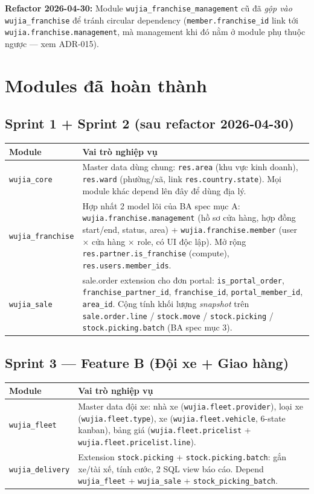 \textbf{Refactor 2026-04-30:} Module \texttt{wujia\_franchise\_management} cũ đã \emph{gộp vào} \texttt{wujia\_franchise} để tránh circular dependency (\texttt{member.franchise\_id} link tới \texttt{wujia.franchise.management}, mà management khi đó nằm ở module phụ thuộc ngược --- xem ADR-015).

\section{Modules đã hoàn thành}

\subsection{Sprint 1 + Sprint 2 (sau refactor 2026-04-30)}

\begin{longtable}{p{4cm} p{10cm}}
\toprule
\textbf{Module} & \textbf{Vai trò nghiệp vụ} \\
\midrule
\endhead
\texttt{wujia\_core} & Master data dùng chung: \texttt{res.area} (khu vực kinh doanh), \texttt{res.ward} (phường/xã, link \texttt{res.country.state}). Mọi module khác depend lên đây để dùng địa lý. \\
\texttt{wujia\_franchise} & Hợp nhất 2 model lõi của BA spec mục A: \texttt{wujia.franchise.management} (hồ sơ cửa hàng, hợp đồng start/end, status, area) + \texttt{wujia.franchise.member} (user × cửa hàng × role, có UI độc lập). Mở rộng \texttt{res.partner.is\_franchise} (compute), \texttt{res.users.member\_ids}. \\
\texttt{wujia\_sale} & sale.order extension cho đơn portal: \texttt{is\_portal\_order}, \texttt{franchise\_partner\_id}, \texttt{franchise\_id}, \texttt{portal\_member\_id}, \texttt{area\_id}. Cộng tính khối lượng \emph{snapshot} trên \texttt{sale.order.line} / \texttt{stock.move} / \texttt{stock.picking} / \texttt{stock.picking.batch} (BA spec mục 3). \\
\bottomrule
\end{longtable}

\subsection{Sprint 3 --- Feature B (Đội xe + Giao hàng)}

\begin{longtable}{p{4cm} p{10cm}}
\toprule
\textbf{Module} & \textbf{Vai trò nghiệp vụ} \\
\midrule
\endhead
\texttt{wujia\_fleet} & Master data đội xe: nhà xe (\texttt{wujia.fleet.provider}), loại xe (\texttt{wujia.fleet.type}), xe (\texttt{wujia.fleet.vehicle}, 6-state kanban), bảng giá (\texttt{wujia.fleet.pricelist} + \texttt{wujia.fleet.pricelist.line}). \\
\texttt{wujia\_delivery} & Extension \texttt{stock.picking} + \texttt{stock.picking.batch}: gắn xe/tài xế, tính cước, 2 SQL view báo cáo. Depend \texttt{wujia\_fleet} + \texttt{wujia\_sale} + \texttt{stock\_picking\_batch}. \\
\bottomrule
\end{longtable}

